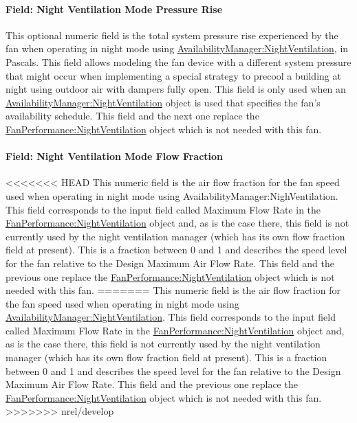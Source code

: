 \paragraph{Field: Night Ventilation Mode Pressure Rise}\label{field-nite-vent-pressure-fansysmodel}

This optional numeric field is the total system pressure rise experienced by the fan when operating in night mode using \hyperref[availabilitymanagernightventilation]{AvailabilityManager:NightVentilation}, in Pascals. This field allows modeling the fan device with a different system pressure that might occur when implementing a special strategy to precool a building at night using outdoor air with dampers fully open. This field is only used when an \hyperref[availabilitymanagernightventilation]{AvailabilityManager:NightVentilation} object is used that specifies the fan's availability schedule. This field and the next one replace the \hyperref[fanperformancenightventilation]{FanPerformance:NightVentilation} object which is not needed with this fan.

\paragraph{Field: Night Ventilation Mode Flow Fraction}\label{field-nite-vent-flow-fraction-fansysmodel}

<<<<<<< HEAD
This numeric field is the air flow fraction for the fan speed used when operating in night mode using AvailabilityManager:NighVentilation. This field corresponds to the input field called Maximum Flow Rate in the \hyperref[fanperformancenightventilation]{FanPerformance:NightVentilation} object and, as is the case there, this field is not currently used by the night ventilation manager (which has its own flow fraction field at present). This is a fraction between 0 and 1 and describes the speed level for the fan relative to the Design Maximum Air Flow Rate. This field and the previous one replace the \hyperref[fanperformancenightventilation]{FanPerformance:NightVentilation} object which is not needed with this fan.
=======
This numeric field is the air flow fraction for the fan speed used when operating in night mode using \hyperref[availabilitymanagernightventilation]{AvailabilityManager:NightVentilation}. This field corresponds to the input field called Maximum Flow Rate in the \hyperref[fanperformancenightventilation]{FanPerformance:NightVentilation} object and, as is the case there, this field is not currently used by the night ventilation manager (which has its own flow fraction field at present). This is a fraction between 0 and 1 and describes the speed level for the fan relative to the Design Maximum Air Flow Rate. This field and the previous one replace the \hyperref[fanperformancenightventilation]{FanPerformance:NightVentilation} object which is not needed with this fan.
>>>>>>> nrel/develop

